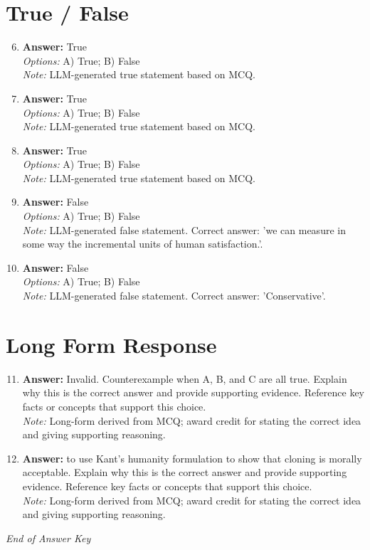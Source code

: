 \documentclass[12pt]{article}
\begin{document}
\section*{True / False}
\begin{enumerate}[label=\arabic*.]
\setcounter{enumi}{5}
\item \textbf{Answer:} True
\\ \textit{Options:} A) True; B) False
\\ \textit{Note:} LLM-generated true statement based on MCQ.
\item \textbf{Answer:} True
\\ \textit{Options:} A) True; B) False
\\ \textit{Note:} LLM-generated true statement based on MCQ.
\item \textbf{Answer:} True
\\ \textit{Options:} A) True; B) False
\\ \textit{Note:} LLM-generated true statement based on MCQ.
\item \textbf{Answer:} False
\\ \textit{Options:} A) True; B) False
\\ \textit{Note:} LLM-generated false statement. Correct answer: 'we can measure in some way the incremental units of human satisfaction.'.
\item \textbf{Answer:} False
\\ \textit{Options:} A) True; B) False
\\ \textit{Note:} LLM-generated false statement. Correct answer: 'Conservative'.
\end{enumerate}

\section*{Long Form Response}
\begin{enumerate}[label=\arabic*.]
\setcounter{enumi}{10}
\item \textbf{Answer:} Invalid. Counterexample when A, B, and C are all true. Explain why this is the correct answer and provide supporting evidence. Reference key facts or concepts that support this choice.
\\ \textit{Note:} Long-form derived from MCQ; award credit for stating the correct idea and giving supporting reasoning.
\item \textbf{Answer:} to use Kant's humanity formulation to show that cloning is morally acceptable. Explain why this is the correct answer and provide supporting evidence. Reference key facts or concepts that support this choice.
\\ \textit{Note:} Long-form derived from MCQ; award credit for stating the correct idea and giving supporting reasoning.
\end{enumerate}

\vfill
\noindent\textit{End of Answer Key}
\end{document}
